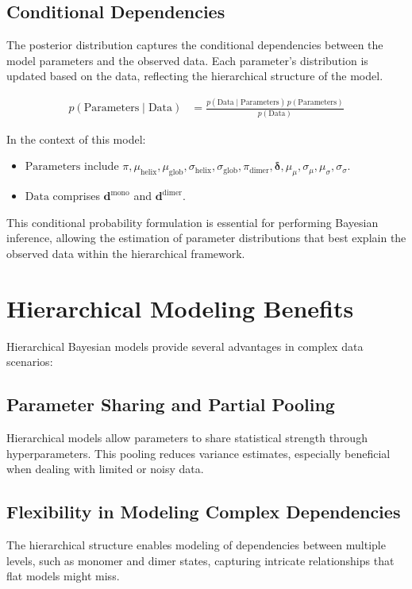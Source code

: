 \documentclass[12pt]{article}
\begin{document}
\subsection{Conditional Dependencies}

The posterior distribution captures the conditional dependencies between the model parameters 
and the observed data. Each parameter's distribution is updated based on the data, reflecting 
the hierarchical structure of the model.

\begin{align}
    p(\text{Parameters} \mid \text{Data}) &= \frac{p(\text{Data} \mid \text{Parameters})\, p(\text{Parameters})}{p(\text{Data})}
\end{align}

\noindent In the context of this model:

\begin{itemize}
    \item \( \text{Parameters} \) include \( \pi, \mu_{\text{helix}}, \mu_{\text{glob}}, \sigma_{\text{helix}}, \sigma_{\text{glob}}, \pi_{\text{dimer}}, \bm{\delta}, \mu_{\mu}, \sigma_{\mu}, \mu_{\sigma}, \sigma_{\sigma} \).
    \item \( \text{Data} \) comprises \( \bm{d}^{\text{mono}} \) and \( \bm{d}^{\text{dimer}} \).
\end{itemize}

This conditional probability formulation is essential for performing Bayesian inference, 
allowing the estimation of parameter distributions that best explain the observed data 
within the hierarchical framework.

\section{Hierarchical Modeling Benefits}

Hierarchical Bayesian models provide several advantages in complex data scenarios:

\subsection{Parameter Sharing and Partial Pooling}
Hierarchical models allow parameters to share statistical strength through hyperparameters. This pooling reduces variance estimates, especially beneficial when dealing with limited or noisy data.

\subsection{Flexibility in Modeling Complex Dependencies}
The hierarchical structure enables modeling of dependencies between multiple levels, such as monomer and dimer states, capturing intricate relationships that flat models might miss.
\end{document}
